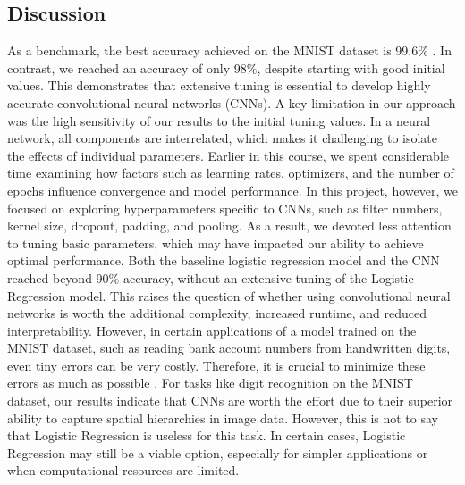 \newpage
\subsection{Discussion}
As a benchmark, the best accuracy achieved on the MNIST dataset is 99.6\% \cite{simard2003mnist}. In contrast, we reached an accuracy of only 98\%, despite starting with good initial values. This demonstrates that extensive tuning is essential to develop highly accurate convolutional neural networks (CNNs). A key limitation in our approach was the high sensitivity of our results to the initial tuning values. In a neural network, all components are interrelated, which makes it challenging to isolate the effects of individual parameters.
\newline
\newline
Earlier in this course, we spent considerable time examining how factors such as learning rates, optimizers, and the number of epochs influence convergence and model performance. In this project, however, we focused on exploring hyperparameters specific to CNNs, such as filter numbers, kernel size, dropout, padding, and pooling. As a result, we devoted less attention to tuning basic parameters, which may have impacted our ability to achieve optimal performance.
\newline
\newline
Both the baseline logistic regression model and the CNN reached beyond 90\% accuracy, without an extensive tuning of the Logistic Regression model. This raises the question of whether using convolutional neural networks is worth the additional complexity, increased runtime, and reduced interpretability. However, in certain applications of a model trained on the MNIST dataset, such as reading bank account numbers from handwritten digits, even tiny errors can be very costly. Therefore, it is crucial to minimize these errors as much as possible \cite{raschka2022machine}. 
\newline
\newline
For tasks like digit recognition on the MNIST dataset, our results indicate that CNNs are worth the effort due to their superior ability to capture spatial hierarchies in image data. However, this is not to say that Logistic Regression is useless for this task. In certain cases, Logistic Regression may still be a viable option, especially for simpler applications or when computational resources are limited. 
